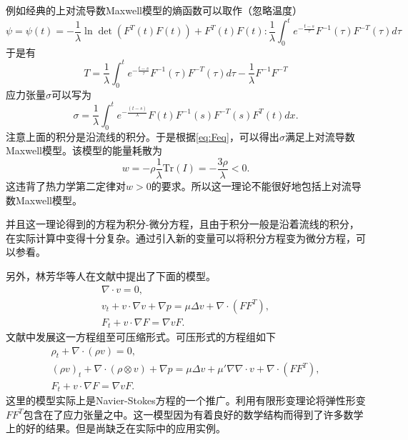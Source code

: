 \documentclass{article}
\begin{document}
例如经典的上对流导数Maxwell模型的熵函数可以取作（忽略温度）
\begin{equation*}
	\psi  = \psi(t) = - \frac{1}{\lambda}  \ln \det (F^T(t) F(t)) + F^T(t) F(t) : \frac{1}{\lambda}  \int_{0}^t e^{-\frac{t-s}{\tau}} F^{-1}(\tau) F^{-T}(\tau) d\tau 
\end{equation*}
于是有
\begin{equation*}
	T = \frac{1}{\lambda}  \int_{0}^t e^{-\frac{t-s}{\tau}} F^{-1}(\tau) F^{-T}(\tau) d\tau -\frac{1}{\lambda}  F^{-1} F^{-T} 
\end{equation*}
应力张量$\sigma$可以写为
\begin{equation*}
	\sigma = \frac{1}{\lambda} \int_{0}^{t} e^{-\frac{(t-s)}{\lambda} } F(t)  F^{-1}(s) F^{-T}(s) F^T(t)  dx.
\end{equation*}
注意上面的积分是沿流线的积分。于是根据\eqref{eq:Feq}，可以得出$\sigma$满足上对流导数Maxwell模型。该模型的能量耗散为
\begin{equation*}
	w = - \rho \frac{1}{\lambda} \mbox{Tr}(I) = -\frac{3\rho}{\lambda} < 0.
\end{equation*}
这违背了热力学第二定律对$w>0$的要求。所以这一理论不能很好地包括上对流导数Maxwell模型。

并且这一理论得到的方程为积分-微分方程，且由于积分一般是沿着流线的积分，在实际计算中变得十分复杂。通过引入新的变量可以将积分方程变为微分方程，可以参看\cite{dimitrienko2010nonlinear}。

另外，林芳华等人在文献\cite{lin2005hydrodynamics}中提出了下面的模型。
\begin{subequations}\label{eq:linincompressible}
	\begin{align}
		\nabla \cdot v = 0, \\
		v_t + v \cdot \nabla v + \nabla p = \mu \Delta v + \nabla \cdot( F F^T), \\
		F_t + v \cdot \nabla F = \nabla v F.
	\end{align}
\end{subequations}
文献\cite{liu2008global}中发展这一方程组至可压缩形式。可压形式的方程组如下
\begin{subequations}\label{eq:lincompressible}
	\begin{align}
		\rho_t + \nabla \cdot (\rho v) = 0, \\
		(\rho v)_t + \nabla \cdot (\rho\otimes v) + \nabla p = \mu \Delta v + \mu' \nabla \nabla \cdot v+ \nabla \cdot( F F^T), \\
		F_t + v \cdot \nabla F = \nabla v F.
	\end{align}
\end{subequations}
这里的模型实际上是Navier-Stokes方程的一个推广。利用有限形变理论将弹性形变$F F^T$包含在了应力张量之中。这一模型因为有着良好的数学结构而得到了许多数学上的好的结果\cite{lin2012some}。但是尚缺乏在实际中的应用实例。
\end{document}
